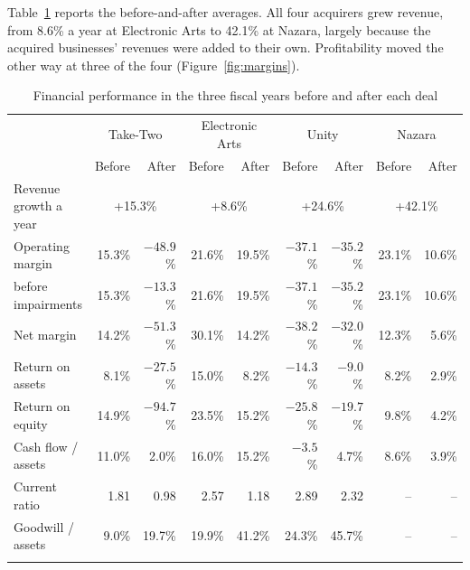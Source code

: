 \documentclass[sn-basic]{sn-jnl}
\begin{document}
Table~\ref{tab:results} reports the before-and-after averages. All four acquirers grew revenue, from 8.6\% a year at Electronic Arts to 42.1\% at Nazara, largely because the acquired businesses' revenues were added to their own. Profitability moved the other way at three of the four (Figure~\ref{fig:margins}).

\begin{table}[t]
\caption{Financial performance in the three fiscal years before and after each deal}\label{tab:results}
\scriptsize
\setlength{\tabcolsep}{3pt}
\begin{tabular}{@{}lrrrrrrrr@{}}
\toprule
 & \multicolumn{2}{c}{Take-Two} & \multicolumn{2}{c}{Electronic Arts} & \multicolumn{2}{c}{Unity} & \multicolumn{2}{c}{Nazara} \\
 & Before & After & Before & After & Before & After & Before & After \\
\midrule
Revenue growth a year & \multicolumn{2}{c}{+15.3\%} & \multicolumn{2}{c}{+8.6\%} & \multicolumn{2}{c}{+24.6\%} & \multicolumn{2}{c}{+42.1\%} \\
Operating margin & 15.3\% & $-48.9$\% & 21.6\% & 19.5\% & $-37.1$\% & $-35.2$\% & 23.1\% & 10.6\% \\
\quad before impairments & 15.3\% & $-13.3$\% & 21.6\% & 19.5\% & $-37.1$\% & $-35.2$\% & 23.1\% & 10.6\% \\
Net margin & 14.2\% & $-51.3$\% & 30.1\% & 14.2\% & $-38.2$\% & $-32.0$\% & 12.3\% & 5.6\% \\
Return on assets & 8.1\% & $-27.5$\% & 15.0\% & 8.2\% & $-14.3$\% & $-9.0$\% & 8.2\% & 2.9\% \\
Return on equity & 14.9\% & $-94.7$\% & 23.5\% & 15.2\% & $-25.8$\% & $-19.7$\% & 9.8\% & 4.2\% \\
Cash flow / assets & 11.0\% & 2.0\% & 16.0\% & 15.2\% & $-3.5$\% & 4.7\% & 8.6\% & 3.9\% \\
Current ratio & 1.81 & 0.98 & 2.57 & 1.18 & 2.89 & 2.32 & -- & -- \\
Goodwill / assets & 9.0\% & 19.7\% & 19.9\% & 41.2\% & 24.3\% & 45.7\% & -- & -- \\
\botrule
\end{tabular}
\end{table}
\end{document}
